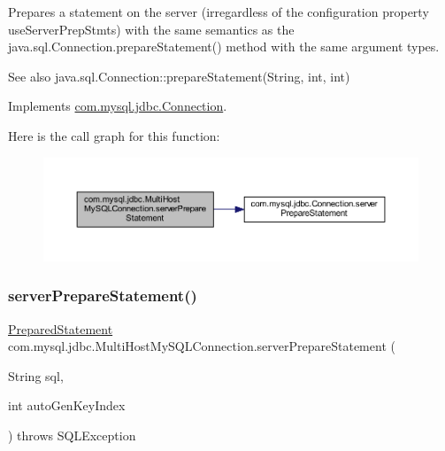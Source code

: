 Prepares a statement on the server (irregardless of the configuration property \textquotesingle{}use\+Server\+Prep\+Stmts\textquotesingle{}) with the same semantics as the java.\+sql.\+Connection.\+prepare\+Statement() method with the same argument types.

\begin{DoxySeeAlso}{See also}
java.\+sql.\+Connection\+::prepare\+Statement(\+String, int, int) 
\end{DoxySeeAlso}


Implements \mbox{\hyperlink{interfacecom_1_1mysql_1_1jdbc_1_1_connection_acda6552c537e45e1d46a1d8e21beefe3}{com.\+mysql.\+jdbc.\+Connection}}.

Here is the call graph for this function\+:
\nopagebreak
\begin{figure}[H]
\begin{center}
\leavevmode
\includegraphics[width=350pt]{classcom_1_1mysql_1_1jdbc_1_1_multi_host_my_s_q_l_connection_a6327530074443cc7c221a1323f871b65_cgraph}
\end{center}
\end{figure}
\mbox{\label{classcom_1_1mysql_1_1jdbc_1_1_multi_host_my_s_q_l_connection_ab243fd44a8b19e2cf489e88a469dcee3}} 
\subsubsection{\texorpdfstring{server\+Prepare\+Statement()}{serverPrepareStatement()}\hspace{0.1cm}{\footnotesize\ttfamily [3/6]}}
{\footnotesize\ttfamily \mbox{\hyperlink{classcom_1_1mysql_1_1jdbc_1_1_prepared_statement}{Prepared\+Statement}} com.\+mysql.\+jdbc.\+Multi\+Host\+My\+S\+Q\+L\+Connection.\+server\+Prepare\+Statement (\begin{DoxyParamCaption}\item[{String}]{sql,  }\item[{int}]{auto\+Gen\+Key\+Index }\end{DoxyParamCaption}) throws S\+Q\+L\+Exception}

